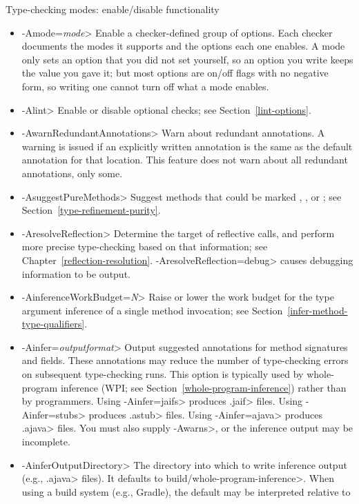Type-checking modes:  enable/disable functionality
\begin{itemize}
\item \<-Amode=\emph{mode}>
  Enable a checker-defined group of options.  Each checker documents the modes it supports and
  the options each one enables.  A mode only sets an option that you did not set yourself, so an
  option you write keeps the value you gave it; but most options are on/off flags with no
  negative form, so writing one cannot turn off what a mode enables.
\item \<-Alint>
  Enable or disable optional checks; see Section~\ref{lint-options}.
\item \<-AwarnRedundantAnnotations>
  Warn about redundant annotations.
  A warning is issued if an explicitly written annotation
  is the same as the default annotation for that location.
  This feature does not warn about all redundant annotations, only some.
\item \<-AsuggestPureMethods>
  Suggest methods that could be marked
  ,
  ,
  or ; see
  Section~\ref{type-refinement-purity}.
\item \<-AresolveReflection>
  Determine the target of reflective calls, and perform more precise
  type-checking based on that information; see
  Chapter~\ref{reflection-resolution}.  \<-AresolveReflection=debug> causes
  debugging information to be output.
\item \<-AinferenceWorkBudget=\emph{N}>
  Raise or lower the work budget for the type argument inference of a single
  method invocation; see Section~\ref{infer-method-type-qualifiers}.
\item \<-Ainfer=\emph{outputformat}>
  Output suggested annotations for method signatures and fields.
  These annotations may reduce the number of type-checking
  errors on subsequent type-checking runs.  This option is
  typically used by whole-program inference (WPI; see
  Section~\ref{whole-program-inference}) rather than by programmers.
  Using \<-Ainfer=jaifs> produces \<.jaif> files.
  Using \<-Ainfer=stubs> produces \<.astub> files.
  Using \<-Ainfer=ajava> produces \<.ajava> files.
  You must also supply \<-Awarns>, or the inference output may be incomplete.
\item \<-AinferOutputDirectory>
  The directory into which to write inference output (e.g., \<.ajava>
  files).  It defaults to \<build/whole-program-inference>.  When using
  a build system (e.g., Gradle), the default may be interpreted relative to

\end{itemize}
